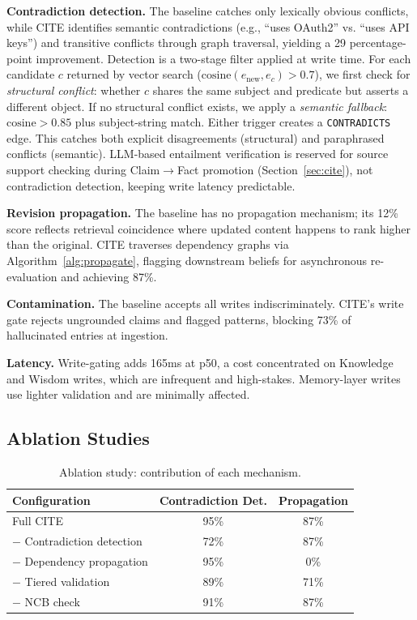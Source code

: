 \documentclass[11pt,letterpaper]{article}
\begin{document}
\textbf{Contradiction detection.} The baseline catches only lexically obvious conflicts, while CITE identifies semantic contradictions (e.g., ``uses OAuth2'' vs. ``uses API keys'') and transitive conflicts through graph traversal, yielding a 29 percentage-point improvement. Detection is a two-stage filter applied at write time. For each candidate $c$ returned by vector search ($\text{cosine}(e_\text{new}, e_c) > 0.7$), we first check for \emph{structural conflict}: whether $c$ shares the same subject and predicate but asserts a different object. If no structural conflict exists, we apply a \emph{semantic fallback}: $\text{cosine} > 0.85$ plus subject-string match. Either trigger creates a \texttt{CONTRADICTS} edge. This catches both explicit disagreements (structural) and paraphrased conflicts (semantic). LLM-based entailment verification is reserved for source support checking during Claim$\rightarrow$Fact promotion (Section~\ref{sec:cite}), not contradiction detection, keeping write latency predictable.

\textbf{Revision propagation.} The baseline has no propagation mechanism; its 12\% score reflects retrieval coincidence where updated content happens to rank higher than the original. CITE traverses dependency graphs via Algorithm~\ref{alg:propagate}, flagging downstream beliefs for asynchronous re-evaluation and achieving 87\%.

\textbf{Contamination.} The baseline accepts all writes indiscriminately. CITE's write gate rejects ungrounded claims and flagged patterns, blocking 73\% of hallucinated entries at ingestion.

\textbf{Latency.} Write-gating adds 165ms at p50, a cost concentrated on Knowledge and Wisdom writes, which are infrequent and high-stakes. Memory-layer writes use lighter validation and are minimally affected.

\subsection{Ablation Studies}

\begin{table}[H]
\centering
\caption{Ablation study: contribution of each mechanism.}
\label{tab:ablation}
\begin{tabular}{@{}lcc@{}}
\toprule
\textbf{Configuration} & \textbf{Contradiction Det.} & \textbf{Propagation} \\
\midrule
Full CITE & 95\% & 87\% \\
$-$ Contradiction detection & 72\% & 87\% \\
$-$ Dependency propagation & 95\% & 0\% \\
$-$ Tiered validation & 89\% & 71\% \\
$-$ NCB check & 91\% & 87\% \\
\bottomrule
\end{tabular}
\end{table}
\end{document}
